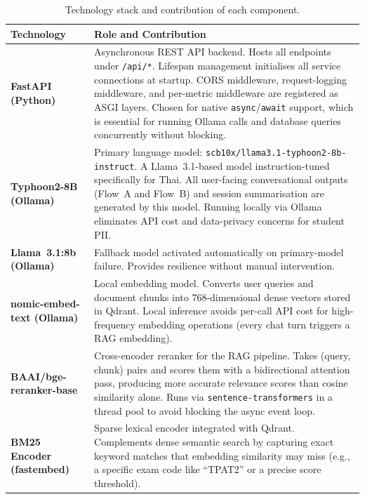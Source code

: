 ﻿\documentclass[12pt,a4paper]{article}
\begin{document}
\begin{table}[htbp]
\centering
\caption{Technology stack and contribution of each component.}
\label{tab:techstack}
\renewcommand{\arraystretch}{1.35}
\begin{tabularx}{\textwidth}{@{}lX@{}}
\toprule
\textbf{Technology} & \textbf{Role and Contribution} \\
\midrule
\textbf{FastAPI (Python)} &
    Asynchronous REST API backend. Hosts all endpoints under \texttt{/api/*}.
    Lifespan management initialises all service connections at startup. CORS
    middleware, request-logging middleware, and per-metric middleware are
    registered as ASGI layers. Chosen for native \texttt{async}/\texttt{await}
    support, which is essential for running Ollama calls and database queries
    concurrently without blocking. \\

\textbf{Typhoon2-8B (Ollama)} &
    Primary language model: \texttt{scb10x/llama3.1-typhoon2-8b-instruct}.
    A Llama~3.1-based model instruction-tuned specifically for Thai. All
    user-facing conversational outputs (Flow~A and Flow~B) and session
    summarisation are generated by this model. Running locally via Ollama
    eliminates API cost and data-privacy concerns for student PII.\\

\textbf{Llama~3.1:8b (Ollama)} &
    Fallback model activated automatically on primary-model failure. Provides
    resilience without manual intervention. \\

\textbf{nomic-embed-text (Ollama)} &
    Local embedding model. Converts user queries and document chunks into
    768-dimensional dense vectors stored in Qdrant. Local inference avoids
    per-call API cost for high-frequency embedding operations (every chat
    turn triggers a RAG embedding). \\

\textbf{BAAI/bge-reranker-base} &
    Cross-encoder reranker for the RAG pipeline. Takes (query, chunk) pairs
    and scores them with a bidirectional attention pass, producing more
    accurate relevance scores than cosine similarity alone. Runs via
    \texttt{sentence-transformers} in a thread pool to avoid blocking the
    async event loop. \\

\textbf{BM25 Encoder (fastembed)} &
    Sparse lexical encoder integrated with Qdrant. Complements dense semantic
    search by capturing exact keyword matches that embedding similarity may miss
    (e.g., a specific exam code like ``TPAT2'' or a precise score threshold). \\


\end{tabularx}
\end{table}
\end{document}
